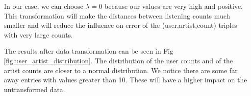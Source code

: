 In our case, we can choose $\lambda=0$ because our values are very high and positive. This transformation will make the distances between listening counts much smaller and will reduce the influence on error of the (user,artist,count) triples with very large counts.

The results after data transformation can be seen in Fig \ref{fig:user_artist_distribution}. The distribution of the user counts and of the artist counts are closer to a normal distribution. We notice there are some far away entries with values greater than 10. These will have a higher impact on the untransformed data. 



